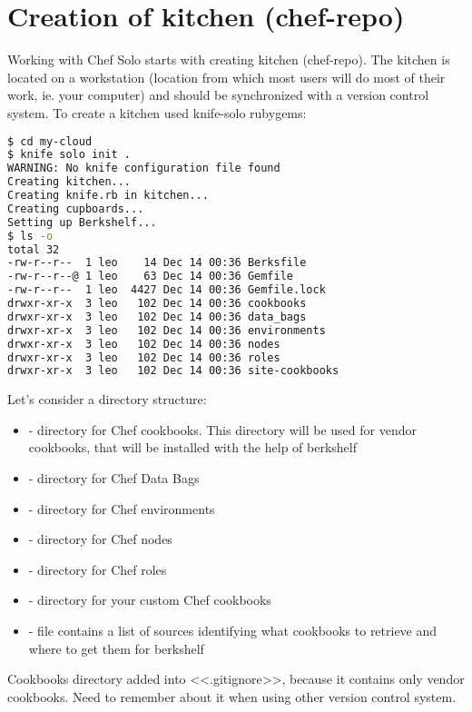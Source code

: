 \section{Creation of kitchen (chef-repo)}
\label{sec:solo-kitchen}

Working with Chef Solo starts with creating kitchen (chef-repo). The kitchen is located on a workstation (location from which most users will do most of their work, ie. your computer) and should be synchronized with a version control system. To create a kitchen used knife-solo rubygems:

\begin{lstlisting}[language=Bash,label=lst:my-cloud-kitchen1,title=my-cloud]
$ cd my-cloud
$ knife solo init .
WARNING: No knife configuration file found
Creating kitchen...
Creating knife.rb in kitchen...
Creating cupboards...
Setting up Berkshelf...
$ ls -o
total 32
-rw-r--r--  1 leo    14 Dec 14 00:36 Berksfile
-rw-r--r--@ 1 leo    63 Dec 14 00:36 Gemfile
-rw-r--r--  1 leo  4427 Dec 14 00:36 Gemfile.lock
drwxr-xr-x  3 leo   102 Dec 14 00:36 cookbooks
drwxr-xr-x  3 leo   102 Dec 14 00:36 data_bags
drwxr-xr-x  3 leo   102 Dec 14 00:36 environments
drwxr-xr-x  3 leo   102 Dec 14 00:36 nodes
drwxr-xr-x  3 leo   102 Dec 14 00:36 roles
drwxr-xr-x  3 leo   102 Dec 14 00:36 site-cookbooks
\end{lstlisting}

Let's consider a directory structure:

\begin{itemize}
  \item {} - directory for Chef cookbooks. This directory will be used for vendor cookbooks, that will be installed with the help of berkshelf
  \item {} - directory for Chef Data Bags
  \item {} - directory for Chef environments
  \item {} - directory for Chef nodes
  \item {} - directory for Chef roles
  \item {} - directory for your custom Chef cookbooks
  \item {} - file contains a list of sources identifying what cookbooks to retrieve and where to get them for berkshelf
\end{itemize}

Cookbooks directory added into <<.gitignore>>, because it contains only vendor cookbooks. Need to remember about it when using other version control system.
